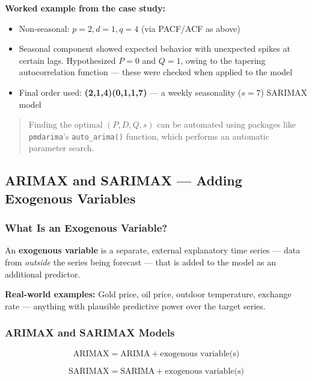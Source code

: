 \documentclass[12pt,openany]{book}
\begin{document}
\textbf{Worked example from the case study:}
\begin{itemize}[leftmargin=*]
    \item Non-seasonal: \(p=2, d=1, q=4\) (via PACF/ACF as above)
    \item Seasonal component showed expected behavior with unexpected spikes at certain lags. Hypothesized \(P=0\) and \(Q=1\), owing to the tapering autocorrelation function --- these were checked when applied to the model
    \item Final order used: \textbf{(2,1,4)(0,1,1,7)} --- a weekly seasonality (\(s=7\)) SARIMAX model
\end{itemize}

\begin{quote}
Finding the optimal \((P, D, Q, s)\) can be automated using packages like \texttt{pmdarima}'s \texttt{auto\_arima()} function, which performs an automatic parameter search.\par

\end{quote}

\subsection{ARIMAX and SARIMAX --- Adding Exogenous Variables}

\subsubsection{What Is an Exogenous Variable?}

An \textbf{exogenous variable} is a separate, external explanatory time series --- data from \textit{outside} the series being forecast --- that is added to the model as an additional predictor.

\textbf{Real-world examples:} Gold price, oil price, outdoor temperature, exchange rate --- anything with plausible predictive power over the target series.

\subsubsection{ARIMAX and SARIMAX Models}

\begin{equation*}
    \text{ARIMAX} = \text{ARIMA} + \text{exogenous variable(s)}
\end{equation*}

\begin{equation*}
    \text{SARIMAX} = \text{SARIMA} + \text{exogenous variable(s)}
\end{equation*}
\end{document}
